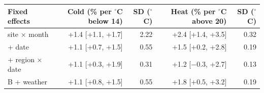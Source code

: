 \begin{tabular}{lrrrr}
\toprule
Fixed effects & Cold (\% per $^\circ$C below 14) & SD ($^\circ$C) & Heat (\% per $^\circ$C above 20) & SD ($^\circ$C) \\
\midrule
site × month & +1.4 [+1.1, +1.7] & 2.22 & +2.4 [+1.4, +3.5] & 0.32 \\
+ date & +1.1 [+0.7, +1.5] & 0.55 & +1.5 [+0.2, +2.8] & 0.19 \\
+ region × date & +1.1 [+0.3, +1.9] & 0.31 & +1.2 [$-$0.3, +2.7] & 0.13 \\
B + weather & +1.1 [+0.8, +1.5] & 0.55 & +1.8 [+0.5, +3.2] & 0.19 \\
\bottomrule
\end{tabular}
